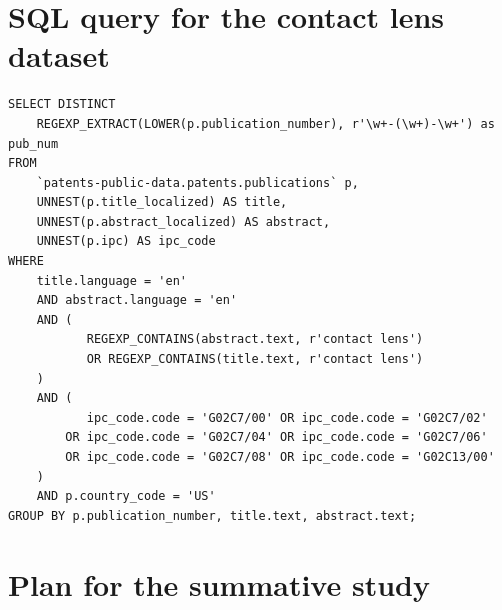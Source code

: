 \section{SQL query for the contact lens dataset}
\label{sec:contact_lens_query}

\begin{verbatim}
SELECT DISTINCT
    REGEXP_EXTRACT(LOWER(p.publication_number), r'\w+-(\w+)-\w+') as pub_num            
FROM
    `patents-public-data.patents.publications` p,
    UNNEST(p.title_localized) AS title,
    UNNEST(p.abstract_localized) AS abstract,
    UNNEST(p.ipc) AS ipc_code
WHERE
    title.language = 'en'
    AND abstract.language = 'en'
    AND (
           REGEXP_CONTAINS(abstract.text, r'contact lens')
           OR REGEXP_CONTAINS(title.text, r'contact lens')
    )
    AND (
           ipc_code.code = 'G02C7/00' OR ipc_code.code = 'G02C7/02' 
        OR ipc_code.code = 'G02C7/04' OR ipc_code.code = 'G02C7/06' 
        OR ipc_code.code = 'G02C7/08' OR ipc_code.code = 'G02C13/00'
    )
    AND p.country_code = 'US' 
GROUP BY p.publication_number, title.text, abstract.text;
\end{verbatim}

\section{Plan for the summative study}
\label{sec:plan_summative_study}

